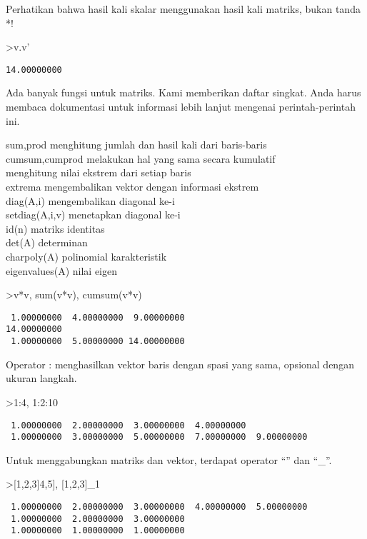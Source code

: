 \documentclass[
]{book}
\begin{document}
Perhatikan bahwa hasil kali skalar menggunakan hasil kali matriks, bukan tanda *!

\textgreater v.v'

\begin{verbatim}
14.00000000 
\end{verbatim}

Ada banyak fungsi untuk matriks. Kami memberikan daftar singkat. Anda harus membaca dokumentasi untuk informasi lebih lanjut mengenai perintah-perintah ini.

sum,prod menghitung jumlah dan hasil kali dari baris-baris\\
cumsum,cumprod melakukan hal yang sama secara kumulatif\\
menghitung nilai ekstrem dari setiap baris\\
extrema mengembalikan vektor dengan informasi ekstrem\\
diag(A,i) mengembalikan diagonal ke-i\\
setdiag(A,i,v) menetapkan diagonal ke-i\\
id(n) matriks identitas\\
det(A) determinan\\
charpoly(A) polinomial karakteristik\\
eigenvalues(A) nilai eigen

\textgreater v*v, sum(v*v), cumsum(v*v)

\begin{verbatim}
 1.00000000  4.00000000  9.00000000 
14.00000000 
 1.00000000  5.00000000 14.00000000 
\end{verbatim}

Operator : menghasilkan vektor baris dengan spasi yang sama, opsional dengan ukuran langkah.

\textgreater1:4, 1:2:10

\begin{verbatim}
 1.00000000  2.00000000  3.00000000  4.00000000 
 1.00000000  3.00000000  5.00000000  7.00000000  9.00000000 
\end{verbatim}

Untuk menggabungkan matriks dan vektor, terdapat operator ``\textbar{}'' dan ``\_''.

\textgreater{[}1,2,3{]}\textbar{[}4,5{]}, {[}1,2,3{]}\_1

\begin{verbatim}
 1.00000000  2.00000000  3.00000000  4.00000000  5.00000000 
 1.00000000  2.00000000  3.00000000 
 1.00000000  1.00000000  1.00000000 
\end{verbatim}
\end{document}
